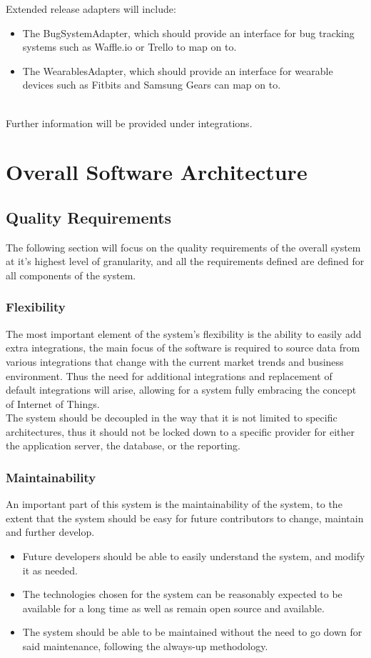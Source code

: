\documentclass[11pt,a4paper]{article}
\begin{document}
Extended release adapters will include:
\begin{itemize}
	\item The BugSystemAdapter, which should provide an interface for bug tracking systems such as Waffle.io or Trello to map on to.
	\item The WearablesAdapter, which should provide an interface for wearable devices such as Fitbits and Samsung Gears can map on to.\\\\ 
\end{itemize}

Further information will be provided under integrations.

\pagebreak

\section{Overall Software Architecture}

\subsection{Quality Requirements}
The following section will focus on the quality requirements of the overall system at it's highest level of granularity, and all the requirements defined are defined for all components of the system.

\subsubsection{Flexibility}
The most important element of the system's flexibility is the ability to easily add extra integrations, the main focus of the software is required to source data from various integrations that change with the current market trends and business environment. Thus the need for additional integrations and replacement of default integrations will arise, allowing for a system fully embracing the concept of Internet of Things.\\
The system should be decoupled in the way that it is not limited to specific architectures, thus it should not be locked down to a specific provider for either the application server, the database, or the reporting.

\subsubsection{Maintainability}
An important part of this system is the maintainability of the system, to the extent that the system should be easy for future contributors to change, maintain and further develop.
\begin{itemize}
	\item Future developers should be able to easily understand the system, and modify it as needed.
	\item The technologies chosen for the system can be reasonably expected to be available for a long time as well as remain open source and available.
	\item The system should be able to be maintained without the need to go down for said maintenance, following the always-up methodology.
\end{itemize}
\end{document}
